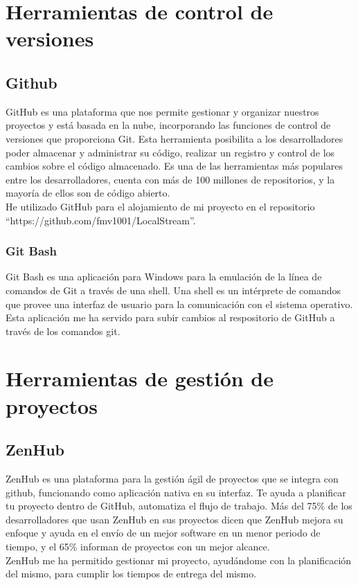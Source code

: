 
\section{Herramientas de control de versiones}

\subsection{Github}

GitHub es una plataforma que nos permite gestionar y organizar nuestros proyectos y está basada en la nube, incorporando las funciones de control de versiones que proporciona Git. Esta herramienta posibilita a los desarrolladores poder almacenar y administrar su código, realizar un registro y control de los cambios sobre el código almacenado. Es una de las herramientas más populares entre los desarrolladores, cuenta con más de 100 millones de repositorios, y la mayoría de ellos son de código abierto.\\
He utilizado GitHub para el alojamiento de mi proyecto en el repositorio ``https://github.com/fmv1001/LocalStream''.

\subsubsection{Git Bash}

Git Bash es una aplicación para Windows para la emulación de la línea de comandos de Git a través de una shell. Una shell es un intérprete de comandos que provee una interfaz de usuario para la comunicación con el sistema operativo. \\
Esta aplicación me ha servido para subir cambios al respositorio de GitHub a través de los comandos git.



\section{Herramientas de gestión de proyectos}

\subsection{ZenHub}

ZenHub es una plataforma para la gestión ágil de proyectos que se integra con github, funcionando como aplicación nativa en su interfaz. Te ayuda a planificar tu proyecto dentro de GitHub, automatiza el flujo de trabajo. Más del 75\% de los desarrolladores que usan ZenHub en sus proyectos dicen que ZenHub mejora su enfoque y ayuda en el envío de un mejor software en un menor periodo de tiempo, y el 65\% informan de proyectos con un mejor alcance.\\
ZenHub me ha permitido gestionar mi proyecto, ayudándome con la planificación del mismo, para cumplir los tiempos de entrega del mismo.




